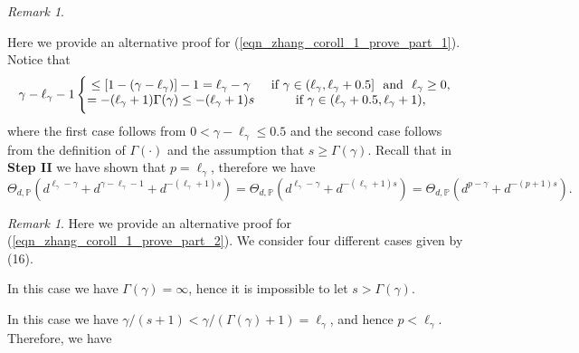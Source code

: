 \documentclass{article}
\theoremstyle{plain}
\theoremstyle{definition}
\theoremstyle{remark}
\newtheorem{remark}[theorem]{Remark}
\begin{document}
\begin{appendix}
\vspace{10pt}

\begin{remark}\label{remark_zhang_coroll_1_prove_part_1}
    
    Here we provide an alternative proof for (\ref{eqn_zhang_coroll_1_prove_part_1}).
    Notice that
    \begin{align*}
        \gamma - \ell_{\gamma} - 1 
        \left\{\begin{matrix}
%
\leq
[1-(\gamma - \ell_{\gamma})]-1 = \ell_{\gamma} - \gamma & \text{ if } \gamma \in (\ell_{\gamma}, \ell_{\gamma}+0.5] ~\text{ and }~ \ell_{\gamma} \geq 0, \\
\vspace{3pt}
= -(\ell_{\gamma}+1)\Gamma(\gamma) \leq -(\ell_{\gamma}+1)s & \text{ if } \gamma \in (\ell_{\gamma}+0.5, \ell_{\gamma}+1),
\end{matrix}\right.
    \end{align*}
    where the first case follows from $0< \gamma - \ell_{\gamma} \leq 0.5$ and the second case follows from the definition of $\Gamma(\cdot)$ and the assumption that $s\geq \Gamma(\gamma)$. 
Recall that in {\bf Step II} we have shown that $p = \ell_{\gamma}$, therefore we have
$$
\Theta_{d, \mathbb{P}} \left( d^{\ell_{\gamma} - \gamma} + d^{\gamma - \ell_{\gamma} - 1} + d^{-(\ell_{\gamma} + 1)  s}\right) 
= 
\Theta_{d, \mathbb{P}} \left( d^{\ell_{\gamma} - \gamma} + d^{-(\ell_{\gamma} + 1)  s}\right)
= \Theta_{d, \mathbb{P}} \left( 
d^{p-\gamma} + 
    d^{-(p+1)s}
\right).
$$
\end{remark}

\vspace{10pt}


\begin{remark}\label{remark_zhang_coroll_1_prove_part_2}
    Here we provide an alternative proof for (\ref{eqn_zhang_coroll_1_prove_part_2}). We consider four different cases given by (16).

\noindent {\bf Case 1: $\gamma \in (0, 0.5]$. } In this case we have $\Gamma(\gamma)=\infty$, hence it is impossible to let $s>\Gamma(\gamma)$.

\noindent {\bf Case 2: $\gamma \in  (\ell_{\gamma}, \ell_{\gamma}+0.5] ~\text{ and }~ \ell_{\gamma} \geq 1$. } In this case we have $\gamma / (s+1) < \gamma / (\Gamma(\gamma)+1)=\ell_{\gamma}$, and hence $p<\ell_{\gamma}$. Therefore, we have


\end{remark}
\end{appendix}
\end{document}
